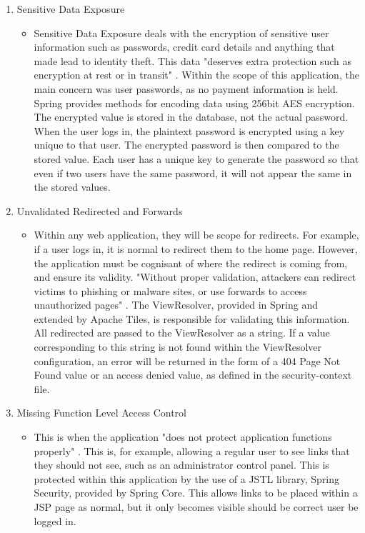 \begin{enumerate}
\item Sensitive Data Exposure
\begin{itemize}
\item Sensitive Data Exposure deals with the encryption of sensitive user information such as passwords, credit card details and anything that made lead to identity theft. This data "deserves extra protection such as 
encryption at rest or in transit" \parencite{owasp2013}. Within the scope of this application, the main concern was user passwords, as no payment information is held. Spring provides methods for encoding data using 256bit AES encryption. The encrypted value is stored in the database, not the actual password. When the user logs in, the plaintext password is encrypted  using a key unique to that user. The encrypted password is then compared to the stored value. Each user has a unique key to generate the password so that even if two users have the same password, it will not appear the same in the stored values. 
\end{itemize}

\item Unvalidated Redirected and Forwards
\begin{itemize}
\item Within any web application, they will be scope for redirects. For example, if a user logs in, it is normal to redirect them to the home page. However, the application must be cognisant of where the redirect is coming from, and ensure its validity. "Without proper validation, attackers can redirect victims to phishing or malware sites, or use forwards to access unauthorized pages" \parencite{owasp2013}. The ViewResolver, provided in Spring and extended by Apache Tiles, is responsible for validating this information. All redirected are passed to the ViewResolver as a string. If a value corresponding to this string is not found within the ViewResolver configuration, an error will be returned in the form of a 404 Page Not Found value or an access denied value, as defined in the security-context file. 
\end{itemize}

\item Missing Function Level Access Control
\begin{itemize}
\item This is when the application "does not protect application functions properly" \parencite{owasp2013}. This is, for example, allowing a regular user to see links that they should not see, such as an administrator control panel. This is protected within this application by the use of a JSTL library, Spring Security, provided by Spring Core. This allows links to be placed within a JSP page as normal, but it only becomes visible should be correct user be logged in.
\end{itemize}


\end{enumerate}
